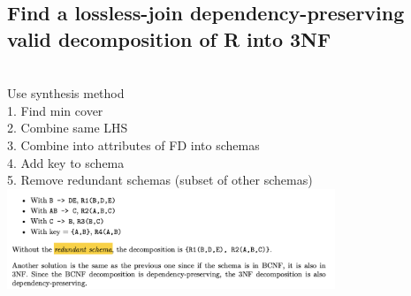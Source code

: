 \documentclass[11pt]{article}
\begin{document}
\begin{multicols*}{3}
\subsection*{Find a lossless-join dependency-preserving valid decomposition of R into 3NF}\\
Use synthesis method\\
1. Find min cover\\
2. Combine same LHS\\
3. Combine into attributes of FD into schemas\\
4. Add key to schema\\
5. Remove redundant schemas (subset of other schemas)\\
\includegraphics[height=3cm]{images/b12}
\end{multicols*}
\end{document}
